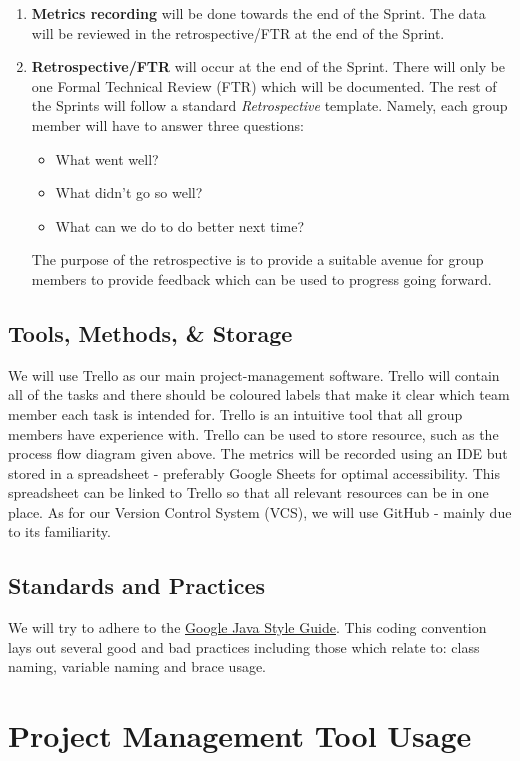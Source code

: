 \documentclass[12pt]{article}
\begin{document}
\begin{enumerate}
    \item \textbf{Metrics recording} will be done towards the end of the Sprint. The data will be reviewed in the retrospective/FTR at the end of the Sprint. 
    \item \textbf{Retrospective/FTR} will occur at the end of the Sprint. There will only be one Formal Technical Review (FTR) which will be documented. The rest of the Sprints will follow a standard \emph{Retrospective} template. Namely, each group member will have to answer three questions: 
    \begin{itemize}
    \item What went well? 
    \item What didn't go so well? 
    \item What can we do to do better next time? 
    \end{itemize}
    The purpose of the retrospective is to provide a suitable avenue for group members to provide feedback which can be used to progress going forward.
\end{enumerate}

\newpage
 
\subsection{Tools, Methods, \& Storage}
 We will use Trello as our main project-management software. Trello will contain all of the tasks and there should be coloured labels that make it clear which team member each task is intended for. Trello is an intuitive tool that all group members have experience with. Trello can be used to store resource, such as the process flow diagram given above. The metrics will be recorded using an IDE but stored in a spreadsheet - preferably Google Sheets for optimal accessibility. This spreadsheet can be linked to Trello so that all relevant resources can be in one place. As for our Version Control System (VCS), we will use GitHub - mainly due to its familiarity.
 
\subsection{Standards and Practices}
We will try to adhere to the \underline{\href{https://google.github.io/styleguide/javaguide.html}{Google Java Style Guide}}. This coding convention lays out several good and bad practices including those which relate to: class naming, variable naming and brace usage. 
\section{Project Management Tool Usage}
\end{document}
